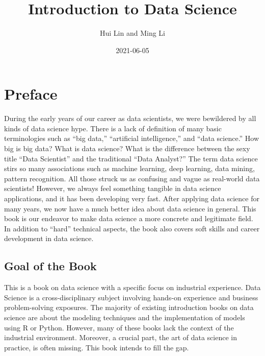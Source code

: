 \documentclass[12pt,]{krantz}
\title{Introduction to Data Science}
\author{Hui Lin and Ming Li}
\date{2021-06-05}
\begin{document}
\maketitle

\thispagestyle{empty}
\begin{center}
\end{center}

\setlength{\abovedisplayskip}{-5pt}
\setlength{\abovedisplayshortskip}{-5pt}

{
\hypersetup{linkcolor=}
\setcounter{tocdepth}{2}
\tableofcontents
}
\listoftables
\listoffigures
\hypertarget{preface}{%
\chapter*{Preface}\label{preface}}


During the early years of our career as data scientists, we were bewildered by all kinds of data science hype. There is a lack of definition of many basic terminologies such as ``big data,'' ``artificial intelligence,'' and ``data science.'' How big is big data? What is data science? What is the difference between the sexy title ``Data Scientist'' and the traditional ``Data Analyst?'' The term data science stirs so many associations such as machine learning, deep learning, data mining, pattern recognition. All those struck us as confusing and vague as real-world data scientists! However, we always feel something tangible in data science applications, and it has been developing very fast. After applying data science for many years, we now have a much better idea about data science in general. This book is our endeavor to make data science a more concrete and legitimate field. In addition to ``hard'' technical aspects, the book also covers soft skills and career development in data science.

\hypertarget{goal-of-the-book}{%
\section*{Goal of the Book}\label{goal-of-the-book}}


This is a book on data science with a specific focus on industrial experience. Data Science is a cross-disciplinary subject involving hands-on experience and business problem-solving exposures. The majority of existing introduction books on data science are about the modeling techniques and the implementation of models using R or Python. However, many of these books lack the context of the industrial environment. Moreover, a crucial part, the art of data science in practice, is often missing. This book intends to fill the gap.
\end{document}
